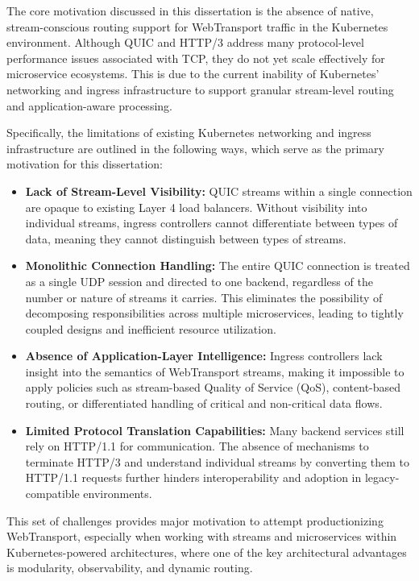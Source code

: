 The core motivation discussed in this dissertation is the absence of native, stream-conscious routing support for WebTransport traffic in the Kubernetes environment. Although QUIC and HTTP/3 address many protocol-level performance issues associated with TCP, they do not yet scale effectively for microservice ecosystems. This is due to the current inability of Kubernetes’ networking and ingress infrastructure to support granular stream-level routing and application-aware processing.

Specifically, the limitations of existing Kubernetes networking and ingress infrastructure are outlined in the following ways, which serve as the primary motivation for this dissertation:

\begin{itemize}
\item \textbf{Lack of Stream-Level Visibility:} QUIC streams within a single connection are opaque to existing Layer 4 load balancers. Without visibility into individual streams, ingress controllers cannot differentiate between types of data, meaning they cannot distinguish between types of streams.

\item \textbf{Monolithic Connection Handling:} The entire QUIC connection is treated as a single UDP session and directed to one backend, regardless of the number or nature of streams it carries. This eliminates the possibility of decomposing responsibilities across multiple microservices, leading to tightly coupled designs and inefficient resource utilization.

\item \textbf{Absence of Application-Layer Intelligence:} Ingress controllers lack insight into the semantics of WebTransport streams, making it impossible to apply policies such as stream-based Quality of Service (QoS), content-based routing, or differentiated handling of critical and non-critical data flows.

\item \textbf{Limited Protocol Translation Capabilities:} Many backend services still rely on HTTP/1.1 for communication. The absence of mechanisms to terminate HTTP/3 and understand individual streams by converting them to HTTP/1.1 requests further hinders interoperability and adoption in legacy-compatible environments.


\end{itemize}

This set of challenges provides major motivation to attempt productionizing WebTransport, especially when working with streams and microservices within Kubernetes-powered architectures, where one of the key architectural advantages is modularity, observability, and dynamic routing.

